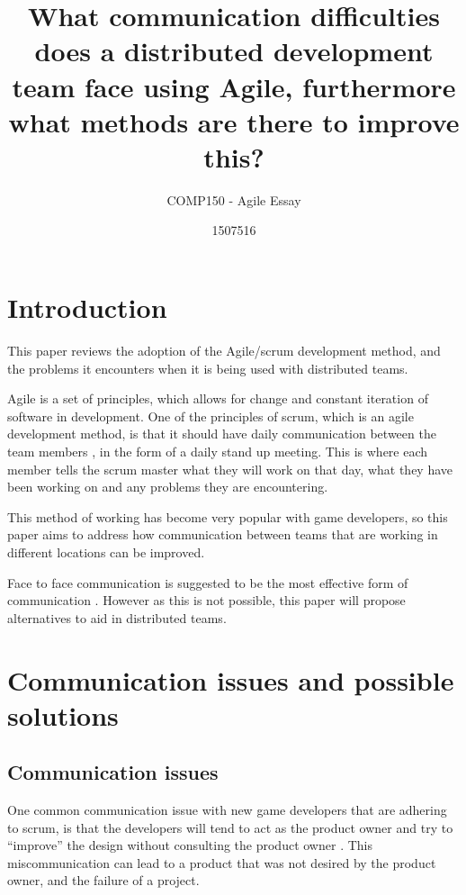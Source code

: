 \documentclass{scrartcl}
\title{What communication difficulties does a distributed development team face using Agile, furthermore what methods are there to improve this?}
\subtitle{COMP150 - Agile Essay}
\author{1507516}
\begin{document}
\maketitle


\section{Introduction}

This paper reviews the adoption of the Agile/scrum development method, and the problems it encounters when it is being used with distributed teams.

Agile is a set of principles, which allows for change and constant iteration of software in development. One of the principles of scrum, which is an agile development method, is that it should have daily communication between the team members \cite{abdullah2011}, in the form of a daily stand up meeting. This is where each member tells the scrum master what they will work on that day, what they have been working on and any problems they are encountering. 

This method of working has become very popular with game developers, so this paper aims to address how communication between teams that are working in different locations can be improved. 

Face to face communication is suggested to be the most effective form of communication \cite{joshi2013}. However as this is not possible, this paper will propose alternatives to aid in distributed teams.

\section{Communication issues and possible solutions}
\subsection{Communication issues}

One common communication issue with new game developers that are adhering to scrum, is that the developers will tend to act as the product owner and try to ``improve'' the design without consulting the product owner \cite{krasteva2008}. This miscommunication can lead to a product that was not desired by the product owner, and the failure of a project. \par
\end{document}
